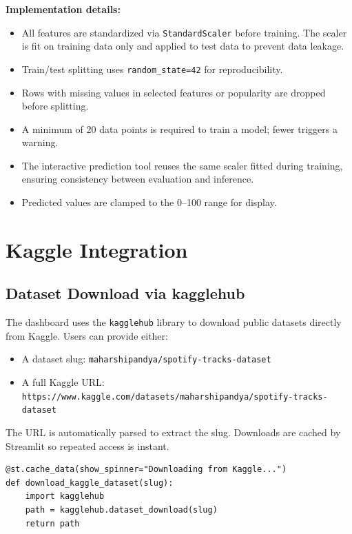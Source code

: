 \documentclass[12pt,a4paper]{article}
\begin{document}
\textbf{Implementation details:}
\begin{itemize}[noitemsep]
    \item All features are standardized via \texttt{StandardScaler} before training. The scaler is fit on training data only and applied to test data to prevent data leakage.
    \item Train/test splitting uses \texttt{random\_state=42} for reproducibility.
    \item Rows with missing values in selected features or popularity are dropped before splitting.
    \item A minimum of 20 data points is required to train a model; fewer triggers a warning.
    \item The interactive prediction tool reuses the same scaler fitted during training, ensuring consistency between evaluation and inference.
    \item Predicted values are clamped to the 0--100 range for display.
\end{itemize}

\section{Kaggle Integration}

\subsection{Dataset Download via kagglehub}

The dashboard uses the \texttt{kagglehub} library to download public datasets directly from Kaggle. Users can provide either:

\begin{itemize}[noitemsep]
    \item A dataset slug: \texttt{maharshipandya/spotify-tracks-dataset}
    \item A full Kaggle URL: \texttt{https://www.kaggle.com/datasets/maharshipandya/spotify-tracks-dataset}
\end{itemize}

The URL is automatically parsed to extract the slug. Downloads are cached by Streamlit so repeated access is instant.

\begin{lstlisting}[style=pythonstyle, caption={Kaggle dataset download}]
@st.cache_data(show_spinner="Downloading from Kaggle...")
def download_kaggle_dataset(slug):
    import kagglehub
    path = kagglehub.dataset_download(slug)
    return path
\end{lstlisting}
\end{document}
